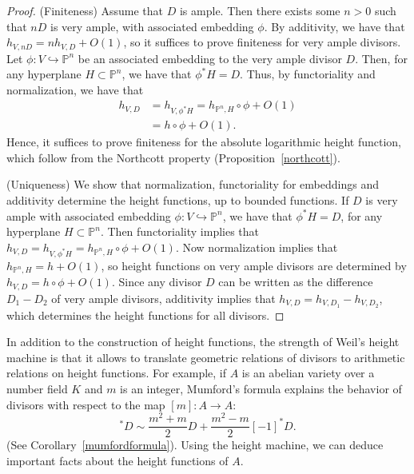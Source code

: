 \documentclass[a4paper, 12pt]{amsart}
\theoremstyle{definition}
\theoremstyle{plain}
\theoremstyle{plain}
\theoremstyle{plain}
\theoremstyle{plain}
\theoremstyle{remark}
\theoremstyle{remark}
\theoremstyle{plain}
\newcommand{\propref}[1]{Proposition~\ref{#1}}
\newcommand{\corref}[1]{Corollary~\ref{#1}}
\begin{document}
\begin{proof}
		(Finiteness) Assume that $D$ is ample. Then there exists some $n>0$ such that $nD$ is very ample, with associated embedding $\phi$. By additivity, we have that $h_{V,nD}=nh_{V,D}+O(1)$, so it suffices to prove finiteness for very ample divisors. Let $\phi:V\hookrightarrow\mathbb{P}^n$ be an associated embedding to the very ample divisor $D$. Then, for any hyperplane $H\subset \mathbb{P}^n$, we have that $\phi^*H=D$. Thus, by functoriality and normalization, we have that
		\begin{align*}
			h_{V,D}&=h_{V,\phi^*H}=h_{\mathbb{P}^n,H}\circ\phi+O(1)\\
			&=h\circ\phi+O(1).
		\end{align*}
		Hence, it suffices to prove finiteness for the absolute logarithmic height function, which follow from the Northcott property (\propref{northcott}).
		
		(Uniqueness) We show that normalization, functoriality for embeddings and additivity determine the height functions, up to bounded functions. If $D$ is very ample with associated embedding $\phi:V\hookrightarrow\mathbb{P}^n$, we have that $\phi^*H=D$, for any hyperplane $H\subset\mathbb{P}^n$. Then functoriality implies that $h_{V,D}=h_{V,\phi^*H}=h_{\mathbb{P}^n,H}\circ\phi+O(1)$. Now normalization implies that $h_{\mathbb{P}^n,H}=h+O(1)$, so height functions on very ample divisors are determined by $h_{V,D}=h\circ\phi+O(1)$. Since any divisor $D$ can be written as the difference $D_1-D_2$ of very ample divisors, additivity implies that $h_{V,D}=h_{V,D_1}-h_{V,D_2}$, which determines the height functions for all divisors.
	\end{proof}
	In addition to the construction of height functions, the strength of Weil's height machine is that it allows to translate geometric relations of divisors to arithmetic relations on height functions. For example, if $A$ is an abelian variety over a number field $K$ and $m$ is an integer, Mumford's formula explains the behavior of divisors with respect to the map $[m]:A\rightarrow A$:
	\begin{equation*}
		[m]^*D\sim\frac{m^2+m}{2}D+\frac{m^2-m}{2}[-1]^*D.
	\end{equation*}
	(See \corref{mumfordformula}). Using the height machine, we can deduce important facts about the height functions of $A$.
	
\end{document}
